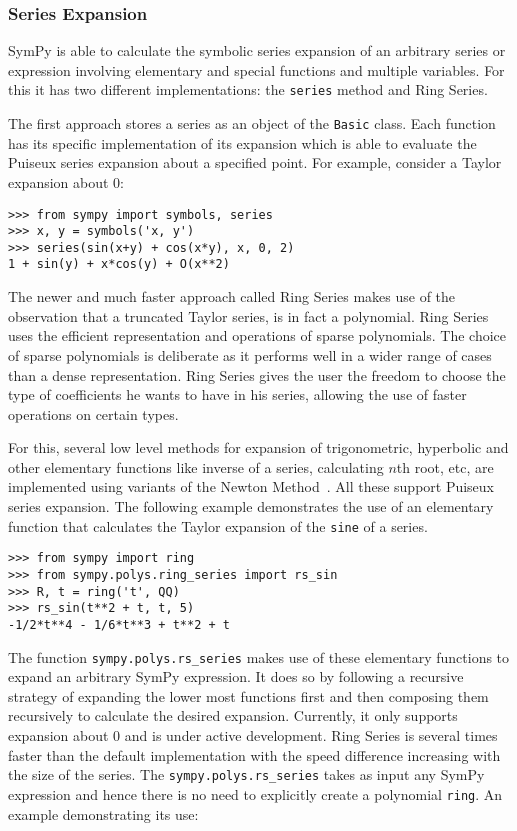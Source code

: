 \subsubsection{Series Expansion}

SymPy is able to calculate the symbolic series expansion of an arbitrary series
or expression involving elementary and special functions and multiple
variables. For this it has two different implementations: the \texttt{series}
method and Ring Series.

The first approach stores a series as an object of the \texttt{Basic} class.
Each function has its specific implementation of its expansion which is able to
evaluate the Puiseux series expansion about a specified point. For example,
consider a Taylor expansion about 0:

\begin{verbatim}
>>> from sympy import symbols, series
>>> x, y = symbols('x, y')
>>> series(sin(x+y) + cos(x*y), x, 0, 2)
1 + sin(y) + x*cos(y) + O(x**2)
\end{verbatim}

The newer and much faster\cite{sympyRingSeries} approach called Ring Series makes use of the
observation that a truncated Taylor series, is in fact a polynomial.
Ring Series uses the efficient representation and operations of sparse
polynomials. The choice of sparse polynomials is deliberate as it performs
well in a wider range of cases than a dense representation. Ring Series gives
the user the freedom to choose the type of coefficients he wants to have in
his series, allowing the use of faster operations on certain types.

For this, several low level methods for expansion of trigonometric, hyperbolic
and other elementary functions like inverse of a series, calculating $n$th
root, etc, are implemented using variants of the Newton Method~\cite{zimmerman}.
All these support Puiseux series expansion. The following example demonstrates
the use of an elementary function that calculates the Taylor expansion of the
\texttt{sine} of a series.

\begin{verbatim}
>>> from sympy import ring
>>> from sympy.polys.ring_series import rs_sin
>>> R, t = ring('t', QQ)
>>> rs_sin(t**2 + t, t, 5)
-1/2*t**4 - 1/6*t**3 + t**2 + t
\end{verbatim}

The function \texttt{sympy.polys.rs\_series} makes use of these elementary
functions to expand an arbitrary SymPy expression. It does so by following a
recursive strategy of expanding the lower most functions first and then
composing them recursively to calculate the desired expansion. Currently, it
only supports expansion about 0 and is under active development. Ring Series
is several times faster than the default implementation with the speed
difference increasing with the size of the series. The
\texttt{sympy.polys.rs\_series} takes as input any SymPy expression and hence
there is no need to explicitly create a polynomial \texttt{ring}. An example
demonstrating its use:

